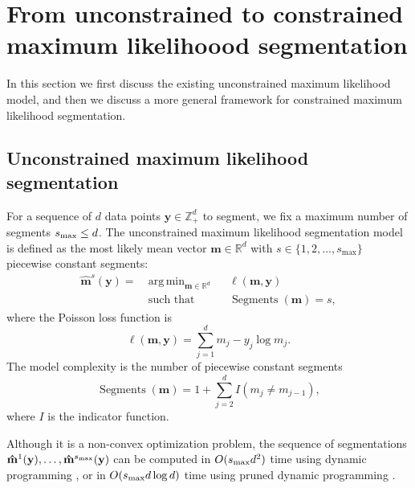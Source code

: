 \documentclass{article}
\DeclareMathOperator*{\argmin}{arg\,min}
\DeclareMathOperator*{\Segments}{Segments}
\newcommand{\ZZ}{\mathbb Z}
\newcommand{\RR}{\mathbb R}
\begin{document}
\section{From unconstrained to constrained maximum likelihoood
  segmentation}
\label{sec:model}

In this section we first discuss the existing unconstrained maximum
likelihood model, and then we discuss a more general framework for
constrained maximum likelihood segmentation.

\subsection{Unconstrained maximum likelihood segmentation}

For a sequence of $d$ data points $\mathbf y\in\ZZ_+^d$ to segment, we
fix a maximum number of segments $ s_{\text{\text{max}}}\leq d$. The
unconstrained maximum likelihood segmentation model is defined as the
most likely mean vector $\mathbf m\in\RR^d$ with $s\in\{1, 2, \dots,
s_{\max}\}$ piecewise constant segments:
\begin{align}
  \label{unconstrained}
  \mathbf{\hat m}^s(\mathbf y)  =\ 
  &\argmin_{\mathbf m\in\RR^{d}} && 
  \ell
  (\mathbf m, \mathbf y) \\
  &\text{such that} && \Segments(\mathbf m)=s,
  \nonumber
\end{align}
where the Poisson loss function is
\begin{equation}\label{eq:loss}
  \ell(\mathbf m, \mathbf y)= \sum_{j=1}^d m_j - y_j \log m_j.
\end{equation} 
The model complexity is the number of piecewise constant segments
\begin{equation}
  \Segments(\mathbf m)=1+\sum_{j=2}^d I(m_j \neq m_{j-1}),
\end{equation}
where $I$ is the indicator function. 

Although it is a non-convex optimization problem, the sequence of
segmentations $\mathbf{\hat m}^1(\mathbf y), \dots, \mathbf{\hat
  m}^{s_{\text{\text{max}}}}(\mathbf y)$ can be computed in
$O(s_{\text{\text{max}}} d^2)$ time using dynamic programming
\citep{bellman}, or in $O(s_{\text{\text{max}}} d \log d)$
time using pruned dynamic programming \citep{pruned-dp, Segmentor}.
\end{document}
